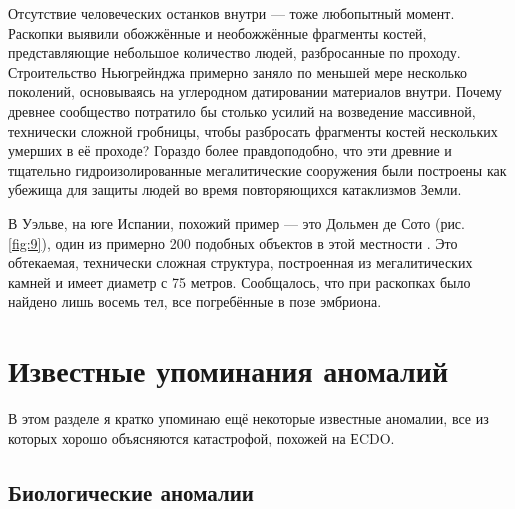 \documentclass[10pt,twocolumn,letterpaper]{article}
\begin{document}
Отсутствие человеческих останков внутри — тоже любопытный момент. Раскопки выявили обожжённые и необожжённые фрагменты костей, представляющие  небольшое количество людей, разбросанные по проходу. Строительство Ньюгрейнджа примерно заняло по меньшей мере несколько поколений, основываясь на углеродном датировании материалов внутри. Почему древнее сообщество потратило бы столько усилий на возведение массивной, технически сложной гробницы, чтобы разбросать фрагменты костей нескольких умерших в её проходе? Гораздо более правдоподобно, что эти древние и тщательно гидроизолированные мегалитические сооружения были построены как убежища для защиты людей во время повторяющихся катаклизмов Земли.

В Уэльве, на юге Испании, похожий пример — это Дольмен де Сото (рис. \ref{fig:9}), один из примерно 200 подобных объектов в этой местности \cite{72,32}. Это обтекаемая, технически сложная структура, построенная из мегалитических камней и имеет диаметр с 75 метров. Сообщалось, что при раскопках было найдено лишь восемь тел, все погребённые в позе эмбриона.

\section{Известные упоминания аномалий}

В этом разделе я кратко упоминаю ещё некоторые известные аномалии, все из которых хорошо объясняются катастрофой, похожей на ЕCDO.

\subsection{Биологические аномалии}
\end{document}
